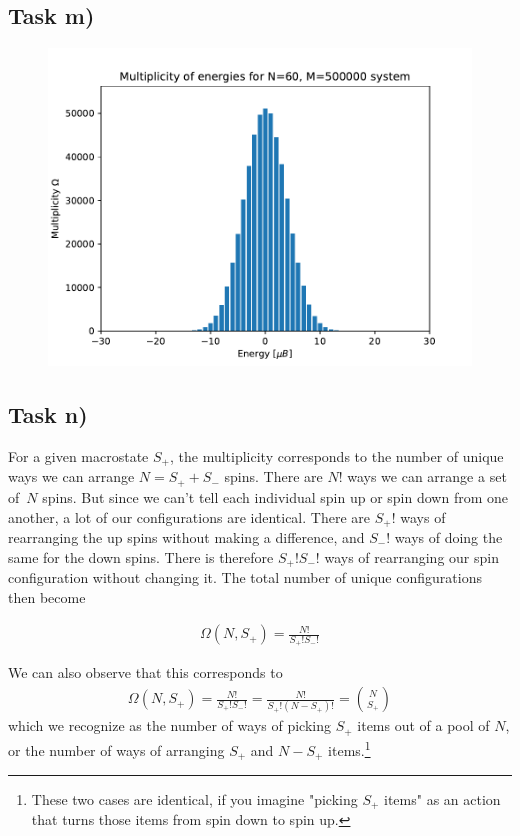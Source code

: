 \documentclass[12p,a4paper]{article}
\begin{document}
\subsection*{Task m)}
\begin{figure}[H]
  \centering
  \includegraphics[scale=0.6]{task_m.pdf}
\end{figure}




\subsection*{Task n)}
For a given macrostate $S_+$, the multiplicity corresponds to the number of unique ways we can arrange $N = S_+ + S_-$ spins. There are $N!$ ways we can arrange a set of $N$ spins. But since we can't tell each individual spin up or spin down from one another, a lot of our configurations are identical. There are $S_+!$ ways of rearranging the up spins without making a difference, and $S_-!$ ways of doing the same for the down spins. There is therefore $S_+!S_-!$ ways of rearranging our spin configuration without changing it. The total number of unique configurations then become

\begin{align*}
  \Omega(N, S_+) = \frac{N!}{S_+!S_-!}
\end{align*}

We can also observe that this corresponds to
\begin{align*}
  \Omega(N, S_+) = \frac{N!}{S_+!S_-!} = \frac{N!}{S_+!(N-S_+)!} = \binom{N}{S_+}
\end{align*}
which we recognize as the number of ways of picking $S_+$ items out of a pool of $N$, or the number of ways of arranging $S_+$ and $N-S_+$ items.\footnote{These two cases are identical, if you imagine "picking $S_+$ items" as an action that turns those items from spin down to spin up.}
\end{document}
